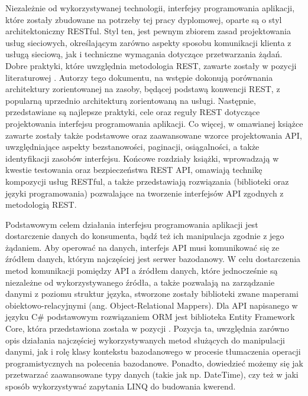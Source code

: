 Niezależnie od wykorzystywanej technologii, interfejsy programowania aplikacji, które zostały zbudowane na potrzeby tej pracy dyplomowej, oparte są o styl architektoniczny RESTful. Styl ten, jest pewnym zbiorem zasad projektowania usług sieciowych, określającym zarówno aspekty sposobu komunikacji klienta z usługą sieciową, jak i techniczne wymagania dotyczące przetwarzania żądań. Dobre praktyki, które uwzględnia metodologia REST, zawarte zostały w pozycji literaturowej \cite{subramanian2019hands}. Autorzy tego dokumentu, na wstępie dokonują porównania architektury zorientowanej na zasoby, będącej podstawą konwencji REST, z popularną uprzednio architekturą zorientowaną na usługi. Następnie, przedstawiane są najlepsze praktyki, cele oraz reguły REST dotyczące projektowania interfejsu programowania aplikacji. Co więcej, w omawianej książce zawarte zostały także podstawowe oraz zaawansowane wzorce projektowania API, uwzględniające aspekty bezstanowości, paginacji, osiągalności, a także identyfikacji zasobów interfejsu. Końcowe rozdziały książki, wprowadzają w kwestie testowania oraz bezpieczeństwa REST API, omawiają technikę kompozycji usług RESTful, a także przedstawiają rozwiązania (biblioteki oraz języki programowania) pozwalające na tworzenie interfejsów API zgodnych z metodologią REST.

Podstawowym celem działania interfejsu programowania aplikacji jest dostarczenie danych do konsumenta, bądź też ich manipulacja zgodnie z jego żądaniem. Aby operować na danych, interfejs API musi komunikować się ze źródłem danych, którym najczęściej jest serwer bazodanowy. W celu dostarczenia metod komunikacji pomiędzy API a źródłem danych, które jednocześnie są niezależne od wykorzystywanego źródła, a także pozwalają na zarządzanie danymi z poziomu struktur języka, stworzone zostały biblioteki zwane maperami obiektowo-relacyjnymi (ang. Object-Relational Mappers). Dla API napisanego w języku C\# podstawowym rozwiązaniem ORM jest biblioteka Entity Framework Core, która przedstawiona została w pozycji \cite{smith2021entity}. Pozycja ta, uwzględnia zarówno opis działania najczęściej wykorzystywanych metod służących do manipulacji danymi, jak i rolę klasy kontekstu bazodanowego w procesie tłumaczenia operacji programistycznych na polecenia bazodanowe. Ponadto, dowiedzieć możemy się jak przetwarzać zaawansowane typy danych (takie jak np. DateTime), czy też w jaki sposób wykorzystywać zapytania LINQ do budowania kwerend.

